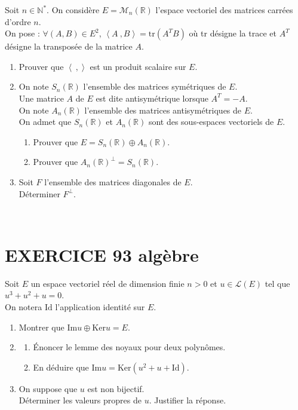 \documentclass[10pt,oneside]{article}
\begin{document}
\begin{flushleft}
 
Soit $n\in\mathbb{N}^*$. On considère $E=\mathcal{M}_n(\mathbb{R})$ l'espace vectoriel des matrices carrées d'ordre $n$.\\
\medskip
On pose : $\forall(A,B)\in E^2$, $\left\langle A\:,B \right\rangle=\mathrm{tr}(A^TB)$ où tr désigne la trace et $A^T$ désigne la transposée de la matrice $A$.
\begin{enumerate}
\item
Prouver que  $\left\langle\:,\right\rangle$ est un produit scalaire sur $E$.
\item
On note $S_n(\mathbb{R})$ l'ensemble des matrices symétriques de $E$.\\
Une matrice $A$ de $E$ est dite antisymétrique lorsque $A^T=-A$.\\
On note $A_n(\mathbb{R})$ l'ensemble des matrices antisymétriques de $E$.\\
On admet que $S_n(\mathbb{R})$  et $A_n(\mathbb{R})$ sont des sous-espaces vectoriels de $E$.
\begin{enumerate}
\item
Prouver que $E=S_n(\mathbb{R})\oplus A_n(\mathbb{R})$.
\item
Prouver que $A_n(\mathbb{R})^\perp=S_n(\mathbb{R})$.
\end{enumerate}
\item
Soit $F$ l'ensemble des matrices diagonales de $E$.\\
Déterminer $F^\perp$.
\end{enumerate}

\medskip
\




\section*{EXERCICE 93 \: algèbre }



  Soit $E$ un espace vectoriel réel de dimension finie $n>0$ et $u\in{\mathcal{ L}(E)}$ tel que
   $u^3+u^2+u=0.$\\
   On notera $\mathrm{Id}$ l'application identité sur $E$.
   \begin{enumerate}
   \item Montrer que $\mathrm{Im }u \oplus \mathrm{Ker} u = E.$
   \item 
   \begin{enumerate}
   \item \'Enoncer le lemme des noyaux pour deux polynômes.
   \item En déduire que $\mathrm{Im }u =\mathrm{Ker} (u^2+u+\mathrm{Id})$.
   \end{enumerate}
  \item
  On suppose que $u$ est non bijectif.\\
Déterminer les valeurs propres de $u$. Justifier la réponse.
   

\end{enumerate}
\end{flushleft}
\end{document}
